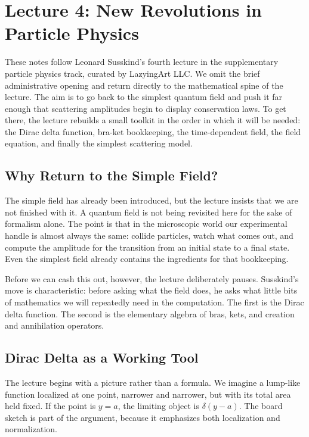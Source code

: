 \chapter{Lecture 4: New Revolutions in Particle Physics}

These notes follow Leonard Susskind's fourth lecture in the supplementary particle physics track, curated by LazyingArt LLC. We omit the brief administrative opening and return directly to the mathematical spine of the lecture. The aim is to go back to the simplest quantum field and push it far enough that scattering amplitudes begin to display conservation laws. To get there, the lecture rebuilds a small toolkit in the order in which it will be needed: the Dirac delta function, bra-ket bookkeeping, the time-dependent field, the field equation, and finally the simplest scattering model.

\section{Why Return to the Simple Field?}

The simple field has already been introduced, but the lecture insists that we are not finished with it. A quantum field is not being revisited here for the sake of formalism alone. The point is that in the microscopic world our experimental handle is almost always the same: collide particles, watch what comes out, and compute the amplitude for the transition from an initial state to a final state. Even the simplest field already contains the ingredients for that bookkeeping.

Before we can cash this out, however, the lecture deliberately pauses. Susskind's move is characteristic: before asking what the field does, he asks what little bits of mathematics we will repeatedly need in the computation. The first is the Dirac delta function. The second is the elementary algebra of bras, kets, and creation and annihilation operators.

\section{Dirac Delta as a Working Tool}

The lecture begins with a picture rather than a formula. We imagine a lump-like function localized at one point, narrower and narrower, but with its total area held fixed. If the point is \(y=a\), the limiting object is \(\delta(y-a)\). The board sketch is part of the argument, because it emphasizes both localization and normalization.


